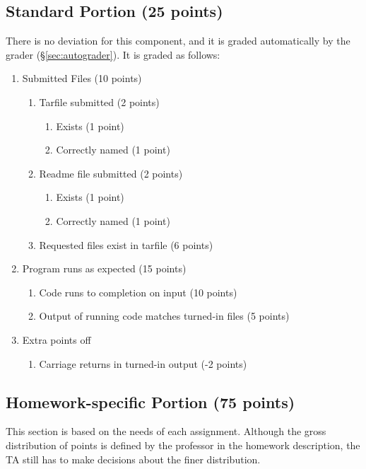 \documentclass[12pt]{article}
\begin{document}
\subsection{Standard Portion (25 points)} \label{sec:standardrubric}

There is no deviation for this component, and it is graded automatically by the grader (\S\ref{sec:autograder}). It is graded as follows:

\begin{enumerate}
\item Submitted Files (10 points)
  \begin{enumerate}
    \item Tarfile submitted (2 points)
    \begin{enumerate}
      \item Exists (1 point)
      \item Correctly named (1 point)
    \end{enumerate}
    \item Readme file submitted (2 points)
    \begin{enumerate}
      \item Exists (1 point)
      \item Correctly named (1 point)
    \end{enumerate}
    \item Requested files exist in tarfile (6 points)
  \end{enumerate}
  \item Program runs as expected (15 points)
  \begin{enumerate}
    \item Code runs to completion on input (10 points)
    \item Output of running code matches turned-in files (5 points)
  \end{enumerate}
  \item Extra points off
  \begin{enumerate}
    \item Carriage returns in turned-in output (-2 points)
  \end{enumerate}
\end{enumerate}

\subsection{Homework-specific Portion (75 points)} \label{sec:specificrubric}

This section is based on the needs of each assignment. Although the gross distribution of points is defined by the professor in the homework description, the TA still has to make decisions about the finer distribution.
\end{document}
